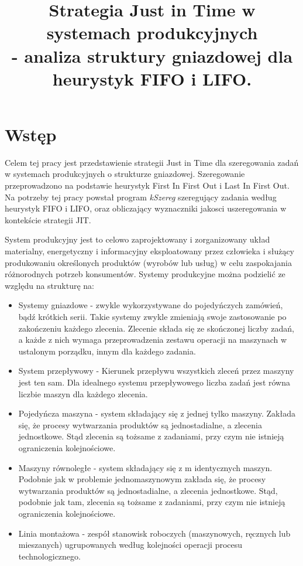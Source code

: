 \documentclass[twoside]{kInzynierka}
\title{Strategia Just in Time w systemach produkcyjnych\\ - analiza struktury gniazdowej dla heurystyk FIFO i LIFO.}
\begin{document}
\section        {Wstęp}
Celem tej pracy jest przedstawienie strategii Just in Time dla szeregowania zadań w systemach produkcyjnych o strukturze gniazdowej. Szeregowanie przeprowadzono na podstawie heurystyk First In First Out i Last In First Out. Na potrzeby tej pracy powstał program \emph{kSzereg} szeregujący zadania według heurystyk FIFO i LIFO, oraz obliczający wyznaczniki jakosci uszeregowania w kontekście strategii JIT.

System produkcyjny jest to celowo zaprojektowany i zorganizowany układ materialny, energetyczny i informacyjny eksploatowany przez człowieka i służący produkowaniu określonych produktów (wyrobów lub usług) w celu zaspokajania różnorodnych potrzeb konsumentów. \cite{pastuszak}
Systemy produkcyjne można podzielić ze względu na strukturę na:
\begin{itemize}
\item Systemy gniazdowe - zwykle wykorzystywane do pojedyńczych zamówień, bądź krótkich serii. Takie systemy zwykle zmieniają swoje zastosowanie po zakończeniu każdego zlecenia. Zlecenie składa się ze skończonej liczby zadań, a każde z nich wymaga przeprowadzenia zestawu operacji na maszynach w ustalonym porządku, innym dla każdego zadania.
\item System przepływowy - Kierunek przepływu wszystkich zleceń przez maszyny jest ten sam. Dla idealnego systemu przepływowego liczba zadań jest równa liczbie maszyn dla każdego zlecenia. \cite{grzechca}
\item Pojedyńcza maszyna - system składający się z jednej tylko maszyny. Zakłada się, że procesy wytwarzania produktów są jednostadialne, a zlecenia jednostkowe. Stąd zlecenia są tożsame z zadaniami, przy czym nie istnieją ograniczenia kolejnościowe. \cite{grzechca}
\item Maszyny równoległe - system składający się z m identycznych maszyn. Podobnie jak w problemie jednomaszynowym zakłada się, że procesy wytwarzania produktów są jednostadialne, a zlecenia jednostkowe. Stąd, podobnie jak tam, zlecenia są tożsame z zadaniami, przy czym nie istnieją ograniczenia kolejnościowe. \cite{grzechca}
\item Linia montażowa -  zespół stanowisk roboczych (maszynowych, ręcznych lub mieszanych) ugrupowanych według kolejności operacji procesu technologicznego. \cite{wiki}
\end{itemize}
\end{document}
